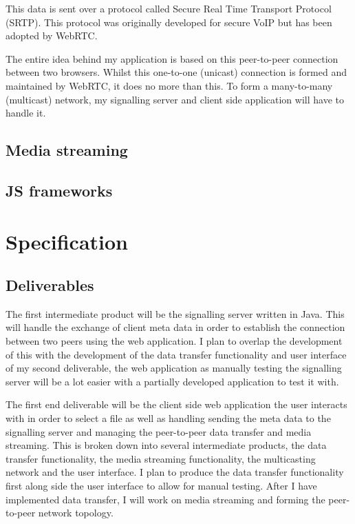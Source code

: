 \documentclass[]{report}
\begin{document}
			This data is sent over a protocol called Secure Real Time Transport Protocol (SRTP). This protocol was originally developed for secure VoIP but has been adopted by WebRTC. 
			
			The entire idea behind my application is based on this peer-to-peer connection between two browsers. Whilst this one-to-one (unicast) connection is formed and maintained by WebRTC, it does no more than this. To form a many-to-many (multicast) network, my signalling server and client side application will have to handle it.
		
		\subsection*{Media streaming}
		\subsection*{JS frameworks}
			
	\section{Specification}
			\subsection*{Deliverables}
			The first intermediate product will be the signalling server written in Java. This will handle the exchange of client meta data in order to establish the connection between two peers using the web application. I plan to overlap the development of this with the development of the data transfer functionality and user interface of my second deliverable, the web application as manually testing the signalling server will be a lot easier with a partially developed application to test it with.
			
			The first end deliverable will be the client side web application the user interacts with in order to select a file as 	well as handling sending the meta data to the signalling server and managing the peer-to-peer data transfer and media streaming. This is broken down into several intermediate products, the data transfer functionality, the media streaming functionality, the multicasting network and the user interface. I plan to produce the data transfer functionality first along side the user interface to allow for manual testing. After I have implemented data transfer, I will work on media streaming and forming the peer-to-peer network topology. 
			
\end{document}
